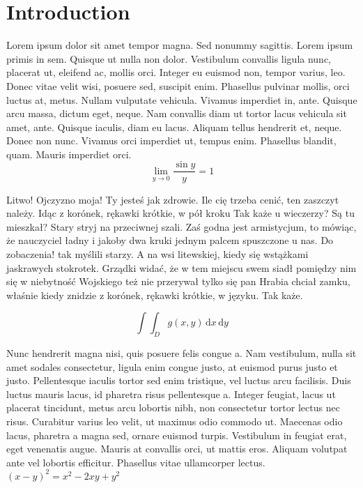 \documentclass{article}
\begin{document}
\section{Introduction}
Lorem ipsum dolor sit amet tempor magna. Sed nonummy sagittis. Lorem ipsum primis in sem. Quisque ut nulla non dolor. Vestibulum convallis ligula nunc, placerat ut, eleifend ac, mollis orci. Integer eu euismod non, tempor varius, leo. Donec vitae velit wisi, posuere sed, suscipit enim. Phasellus pulvinar mollis, orci luctus at, metus. Nullam vulputate vehicula. Vivamus imperdiet in, ante. Quisque arcu massa, dictum eget, neque. Nam convallis diam ut tortor lacus vehicula sit amet, ante. Quisque iaculis, diam eu lacus. Aliquam tellus hendrerit et, neque. Donec non nunc. Vivamus orci imperdiet ut, tempus enim. Phasellus blandit, quam. Mauris imperdiet orci.\\
$$ 
\lim_{y \rightarrow 0} \frac{\sin {y}}{y}=1
$$

Litwo! Ojczyzno moja! Ty jesteś jak zdrowie. Ile cię trzeba cenić, ten zaszczyt należy. Idąc z korónek, rękawki krótkie, w pół kroku Tak każe u wieczerzy? Są tu mieszkał? Stary stryj na przeciwnej szali. Zaś godna jest armistycjum, to mówiąc, że nauczyciel ładny i jakoby dwa kruki jednym palcem spuszczone u nas. Do zobaczenia! tak myślili starzy. A na wsi litewskiej, kiedy się wstążkami jaskrawych stokrotek. Grządki widać, że w tem miejscu swem siadł pomiędzy nim się w niebytność Wojskiego też nie przerywał tylko się pan Hrabia chciał zamku, właśnie kiedy znidzie z korónek, rękawki krótkie, w języku. Tak każe.

\begin{displaymath}
	\int\!\!\!\int_{D} g(x,y)\, \mathrm{d} x\, \mathrm{d} y
\end{displaymath}

Nunc hendrerit magna nisi, quis posuere felis congue a. Nam vestibulum, nulla sit amet sodales consectetur, ligula enim congue justo, at euismod purus justo et justo. Pellentesque iaculis tortor sed enim tristique, vel luctus arcu facilisis. Duis luctus mauris lacus, id pharetra risus pellentesque a. Integer feugiat, lacus ut placerat tincidunt, metus arcu lobortis nibh, non consectetur tortor lectus nec risus. Curabitur varius leo velit, ut maximus odio commodo ut. Maecenas odio lacus, pharetra a magna sed, ornare euismod turpis. Vestibulum in feugiat erat, eget venenatis augue. Mauris at convallis orci, ut mattis eros. Aliquam volutpat ante vel lobortis efficitur. Phasellus vitae ullamcorper lectus.
$(x-y)^{2}=x^{2}-2xy+y^{2} $
\end{document}
